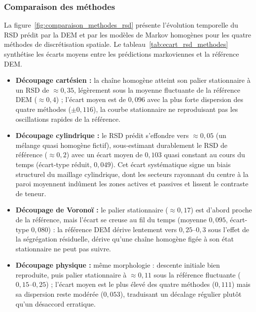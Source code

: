 \documentclass[french]{MemoireMaster}
\begin{document}
\subsubsection{Comparaison des méthodes}
\label{subsec:comparaison_methodes}

La figure~\ref{fig:comparaison_methodes_rsd} présente l'évolution temporelle du RSD prédit par la DEM et par les modèles de Markov homogènes pour les quatre méthodes de discrétisation spatiale. Le tableau~\ref{tab:ecart_rsd_methodes} synthétise les écarts moyens entre les prédictions markoviennes et la référence DEM.

\begin{itemize}[itemsep=5pt]
  \item \textbf{Découpage cartésien :} la chaîne homogène atteint son palier stationnaire à un RSD de $\approx 0{,}35$, légèrement sous la moyenne fluctuante de la référence DEM ($\approx 0{,}4$) ; l'écart moyen est de $0{,}096$ avec la plus forte dispersion des quatre méthodes ($\pm 0{,}116$), la courbe stationnaire ne reproduisant pas les oscillations rapides de la référence.
  
  \item \textbf{Découpage cylindrique :} le RSD prédit s'effondre vers $\approx 0{,}05$ (un mélange quasi homogène fictif), sous-estimant durablement le RSD de référence ($\approx 0{,}2$) avec un écart moyen de $0{,}103$ quasi constant au cours du temps (écart-type réduit, $0{,}049$). Cet écart systématique signe un biais structurel du maillage cylindrique, dont les secteurs rayonnant du centre à la paroi moyennent indûment les zones actives et passives et lissent le contraste de teneur.
  
  \item \textbf{Découpage de Voronoï :} le palier stationnaire ($\approx 0{,}17$) est d'abord proche de la référence, mais l'écart se creuse au fil du temps (moyenne $0{,}095$, écart-type $0{,}080$) : la référence DEM dérive lentement vers $0{,}25$--$0{,}3$ sous l'effet de la ségrégation résiduelle, dérive qu'une chaîne homogène figée à son état stationnaire ne peut pas suivre.
  
  \item \textbf{Découpage physique :} même morphologie : descente initiale bien reproduite, puis palier stationnaire à $\approx 0{,}11$ sous la référence fluctuante ($0{,}15$--$0{,}25$) ; l'écart moyen est le plus élevé des quatre méthodes ($0{,}111$) mais sa dispersion reste modérée ($0{,}053$), traduisant un décalage régulier plutôt qu'un désaccord erratique.
\end{itemize}
\end{document}

